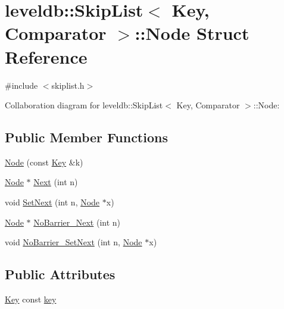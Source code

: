 \hypertarget{structleveldb_1_1_skip_list_1_1_node}{\section{leveldb\-:\-:Skip\-List$<$ Key, Comparator $>$\-:\-:Node Struct Reference}
\label{structleveldb_1_1_skip_list_1_1_node}
}


{\ttfamily \#include $<$skiplist.\-h$>$}



Collaboration diagram for leveldb\-:\-:Skip\-List$<$ Key, Comparator $>$\-:\-:Node\-:
\subsection*{Public Member Functions}
\begin{DoxyCompactItemize}
\item 
\hyperlink{structleveldb_1_1_skip_list_1_1_node_a7dec52445f4f05892239a77407d109b0}{Node} (const \hyperlink{namespaceleveldb_a7e9a9725b13fa0bd922d885280dfab95}{Key} \&k)
\item 
\hyperlink{structleveldb_1_1_skip_list_1_1_node}{Node} $\ast$ \hyperlink{structleveldb_1_1_skip_list_1_1_node_aca7f18fc57f6c8e8a8dfe176eedbde74}{Next} (int n)
\item 
void \hyperlink{structleveldb_1_1_skip_list_1_1_node_a46c7cc10db3d77c85df7e411b720a8f4}{Set\-Next} (int n, \hyperlink{structleveldb_1_1_skip_list_1_1_node}{Node} $\ast$x)
\item 
\hyperlink{structleveldb_1_1_skip_list_1_1_node}{Node} $\ast$ \hyperlink{structleveldb_1_1_skip_list_1_1_node_a96b7213d1fd9ef893f3a7baecc5c4801}{No\-Barrier\-\_\-\-Next} (int n)
\item 
void \hyperlink{structleveldb_1_1_skip_list_1_1_node_af93b362f5e38fcf645820e02377cca64}{No\-Barrier\-\_\-\-Set\-Next} (int n, \hyperlink{structleveldb_1_1_skip_list_1_1_node}{Node} $\ast$x)
\end{DoxyCompactItemize}
\subsection*{Public Attributes}
\begin{DoxyCompactItemize}
\item 
\hyperlink{namespaceleveldb_a7e9a9725b13fa0bd922d885280dfab95}{Key} const \hyperlink{structleveldb_1_1_skip_list_1_1_node_a654f196e057edd294e4dbcbb6dabb844}{key}
\end{DoxyCompactItemize}
